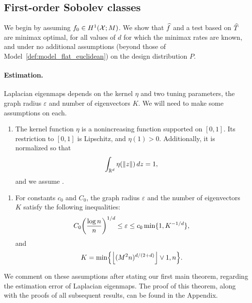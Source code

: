 \subsection{First-order Sobolev classes}
\label{sec:first_order_sobolev_classes}
We begin by assuming $f_0 \in H^1(\mathcal{X}; M)$. We show that $\widehat{f}$ and a test based on $\widehat{T}$ are minimax optimal, for all values of $d$ for which the minimax rates are known, and under no additional assumptions (beyond those of Model~\ref{def:model_flat_euclidean}) on the design distribution $P$.

\paragraph{Estimation.} Laplacian eigenmaps depends on the kernel $\eta$ and two tuning parameters, the graph radius $\varepsilon$ and number of eigenvectors $K$. We will need to make some assumptions on each.
\begin{enumerate}[label=(K\arabic*)]
	\setcounter{enumi}{0}
	\item
	\label{asmp:kernel_flat_euclidean}
	The kernel function $\eta$ is a nonincreasing function supported on $[0,1]$. Its restriction to $[0,1]$ is Lipschitz, and $\eta(1) > 0$. Additionally, it is normalized so that
	\begin{equation*}
	\int_{\mathbb{R}^d} \eta(\|z\|) \,dz = 1,
	\end{equation*}
	and we assume .
\end{enumerate}
\begin{enumerate}[label=(P\arabic*)]
	\setcounter{enumi}{0}
	\item 
	\label{asmp:parameters_estimation_fo} 
	For constants $c_0$ and $C_0$, the graph radius $\varepsilon$ and the number of eigenvectors $K$ satisfy the following inequalities:
	\begin{equation}\\
	\label{eqn:radius_fo} 
	C_0\biggl(\frac{\log n}{n}\biggr)^{1/d} \leq \varepsilon \leq c_0\min\{1,K^{-1/d}\},
	\end{equation}
	and 
	\begin{equation}
	\label{eqn:eigenvector_estimation_fo} 
	K = \min\Bigl\{\left\lfloor (M^2n)^{d/(2 + d)} \right\rfloor \vee 1, n\Bigr\}.
	\end{equation}
\end{enumerate}
We comment on these assumptions after stating our first main theorem, regarding the estimation error of Laplacian eigenmaps. The proof of this theorem, along with the proofs of all subsequent results, can be found in the Appendix.
